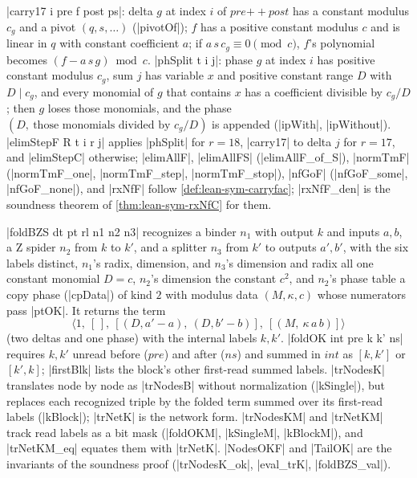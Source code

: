 \begin{definition}\label{def:lean-sym-fold-rules}
\lean|carry17 i pre f post ps|: delta $g$ at index $i$ of $\mathit{pre}\mathbin{+\!\!+}\mathit{post}$ has a constant modulus $c_g$ and a pivot $(q,s,\ldots)$ (\lean|pivotOf|); $f$ has a positive constant modulus $c$ and is linear in $q$ with constant coefficient $a$; if $a\,s\,c_g\equiv 0\pmod c$, $f$'s polynomial becomes $(f-a\,s\,g)\bmod c$. \lean|phSplit t i j|: phase $g$ at index $i$ has positive constant modulus $c_g$, sum $j$ has variable $x$ and positive constant range $D$ with $D\mid c_g$, and every monomial of $g$ that contains $x$ has a coefficient divisible by $c_g/D$; then $g$ loses those monomials, and the phase $(D,\ \text{those monomials divided by }c_g/D)$ is appended (\lean|ipWith|, \lean|ipWithout|). \lean|elimStepF R t i r j| applies \lean|phSplit| for $r=18$, \lean|carry17| to delta $j$ for $r=17$, and \lean|elimStepC| otherwise; \lean|elimAllF|, \lean|elimAllFS| (\lean|elimAllF_of_S|), \lean|normTmF| (\lean|normTmF_one|, \lean|normTmF_step|, \lean|normTmF_stop|), \lean|nfGoF| (\lean|nfGoF_some|, \lean|nfGoF_none|), and \lean|rxNfF| follow \cref{def:lean-sym-carryfac}; \lean|rxNfF_den| is the soundness theorem of \cref{thm:lean-sym-rxNfC} for them.
\end{definition}

\begin{definition}\label{def:lean-sym-foldBZS}
\lean|foldBZS dt pt rl n1 n2 n3| recognizes a binder $n_1$ with output $k$ and inputs $a,b$, a Z spider $n_2$ from $k$ to $k'$, and a splitter $n_3$ from $k'$ to outputs $a',b'$, with the six labels distinct, $n_1$'s radix, dimension, and $n_3$'s dimension and radix all one constant monomial $D=c$, $n_2$'s dimension the constant $c^2$, and $n_2$'s phase table a copy phase (\lean|cpData|) of kind $2$ with modulus data $(M,\kappa,c)$ whose numerators pass \lean|ptOK|. It returns the term
\[
\bigl\langle 1,\ [\,],\ [(D,a'-a),\ (D,b'-b)],\ [(M,\ \kappa\,a\,b)]\bigr\rangle
\]
(two deltas and one phase) with the internal labels $k,k'$. \lean|foldOK int pre k k' ns| requires $k,k'$ unread before ($\mathit{pre}$) and after ($ns$) and summed in $int$ as $[k,k']$ or $[k',k]$; \lean|firstBlk| lists the block's other first-read summed labels. \lean|trNodesK| translates node by node as \lean|trNodesB| without normalization (\lean|kSingle|), but replaces each recognized triple by the folded term summed over its first-read labels (\lean|kBlock|); \lean|trNetK| is the network form. \lean|trNodesKM| and \lean|trNetKM| track read labels as a bit mask (\lean|foldOKM|, \lean|kSingleM|, \lean|kBlockM|), and \lean|trNetKM_eq| equates them with \lean|trNetK|. \lean|NodesOKF| and \lean|TailOK| are the invariants of the soundness proof (\lean|trNodesK_ok|, \lean|eval_trK|, \lean|foldBZS_val|).
\end{definition}

